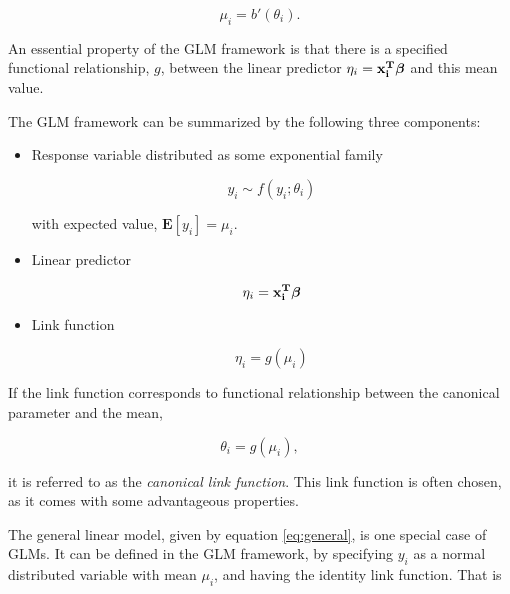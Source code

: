 \begin{equation}
    \mu_i = b'(\theta_i).
\end{equation}

An essential property of the GLM framework is that there is a specified functional relationship, $g$, between the linear predictor $\eta_i = \bf x_i^T \bm{ \beta}$ and this mean value.

The GLM framework can be summarized by the following three components:

\begin{itemize}

\item Response variable distributed as some exponential family

\begin{equation}
    y_{i} \sim f(y_i;\theta_i)
\end{equation}

with expected value, $\mathbf{E}[y_i] = \mu_i$.

\item Linear predictor

\begin{equation}
    \eta_i = \bf x_i^T \bm{ \beta}
\end{equation}

\item Link function

\begin{equation}
    \eta_i = g(\mu_i)
\end{equation}

\end{itemize}





If the link function corresponds to functional relationship between the canonical parameter and the mean,

\begin{equation}
\theta_i = g(\mu_i),
\end{equation}

it is referred to as the \textit{canonical link function}. This link function is often chosen, as it comes with some advantageous properties.

The general linear model, given by equation \ref{eq:general}, is one special case of GLMs. It can be defined in the GLM framework, by specifying $y_i$ as a normal distributed variable with mean $\mu_i$, and having the identity link function. That is


